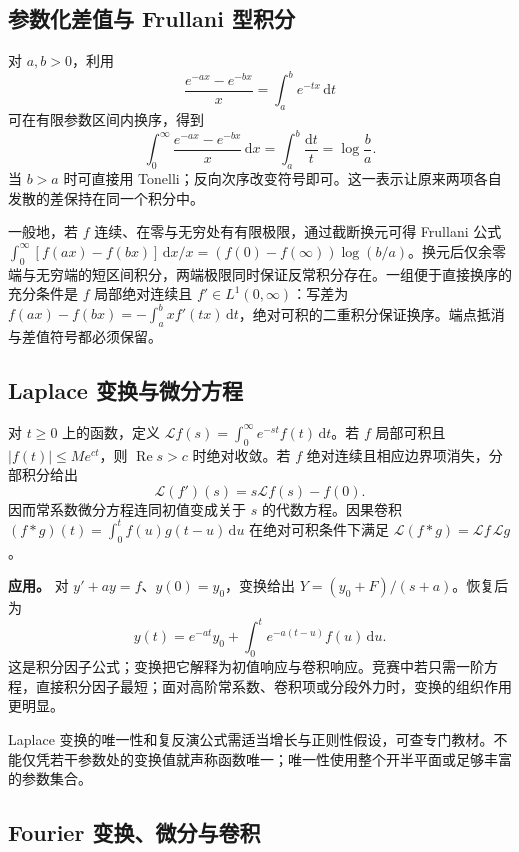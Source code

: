 \documentclass[UTF8,12pt,a4paper,fontset=fandol]{ctexart}
\begin{document}
\subsection{参数化差值与 Frullani 型积分}

\label{app:transform-frullani}

对 $a,b>0$，利用
\[
\frac{e^{-ax}-e^{-bx}}x=\int_a^be^{-tx}\,\mathrm dt
\]
可在有限参数区间内换序，得到
\[
\int_0^\infty\frac{e^{-ax}-e^{-bx}}x\,\mathrm dx
=\int_a^b\frac{\mathrm dt}{t}=\log\frac ba.
\]
当 $b>a$ 时可直接用 Tonelli；反向次序改变符号即可。这一表示让原来两项各自发散的差保持在同一个积分中。

一般地，若 $f$ 连续、在零与无穷处有有限极限，通过截断换元可得 Frullani 公式 $\int_0^\infty[f(ax)-f(bx)]\,\mathrm dx/x=(f(0)-f(\infty))\log(b/a)$。换元后仅余零端与无穷端的短区间积分，两端极限同时保证反常积分存在。一组便于直接换序的充分条件是 $f$ 局部绝对连续且 $f'\in L^1(0,\infty)$：写差为 $f(ax)-f(bx)=-\int_a^bxf'(tx)\,\mathrm dt$，绝对可积的二重积分保证换序。端点抵消与差值符号都必须保留。

\subsection{Laplace 变换与微分方程}

\label{app:transform-laplace}

对 $t\geq0$ 上的函数，定义 $\mathcal Lf(s)=\int_0^\infty e^{-st}f(t)\,\mathrm dt$。若 $f$ 局部可积且 $|f(t)|\leq Me^{ct}$，则 $\operatorname{Re}s>c$ 时绝对收敛。若 $f$ 绝对连续且相应边界项消失，分部积分给出
\[
\mathcal L(f')(s)=s\mathcal Lf(s)-f(0).
\]
因而常系数微分方程连同初值变成关于 $s$ 的代数方程。因果卷积 $(f*g)(t)=\int_0^tf(u)g(t-u)\,\mathrm du$ 在绝对可积条件下满足 $\mathcal L(f*g)=\mathcal Lf\,\mathcal Lg$。

\textbf{应用。} 对 $y'+ay=f$、$y(0)=y_0$，变换给出 $Y=(y_0+F)/(s+a)$。恢复后为
\[
y(t)=e^{-at}y_0+\int_0^te^{-a(t-u)}f(u)\,\mathrm du.
\]
这是积分因子公式；变换把它解释为初值响应与卷积响应。竞赛中若只需一阶方程，直接积分因子最短；面对高阶常系数、卷积项或分段外力时，变换的组织作用更明显。

Laplace 变换的唯一性和复反演公式需适当增长与正则性假设，可查专门教材。不能仅凭若干参数处的变换值就声称函数唯一；唯一性使用整个开半平面或足够丰富的参数集合。

\subsection{Fourier 变换、微分与卷积}
\end{document}
